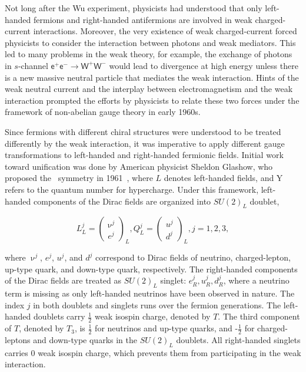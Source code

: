 Not long after the Wu experiment, physicists had understood that only left-handed fermions and right-handed antifermions are involved in weak charged-current interactions. Moreover, the very existence of weak charged-current forced physicists to consider the interaction between photons and weak mediators. This led to many problems in the weak theory, for example, the exchange of photons in $s$-channel $\textsf{e}^{+}\textsf{e}^{-}\rightarrow\textsf{W}^{+}\textsf{W}^{-}$ would lead to divergence at high energy unless there is a new massive neutral particle that mediates the weak interaction. Hints of the weak neutral current and the interplay between electromagnetism and the weak interaction prompted the efforts by physicists to relate these two forces under the framework of non-abelian gauge theory in early 1960s. 

Since fermions with different chiral structures were understood to be treated differently by the weak interaction, it was 
imperative to apply different gauge transformations to left-handed and right-handed fermionic fields. Initial work toward unification was done by American physicist Sheldon Glashow, who proposed the \ew~symmetry in 1961~\cite{Glashow:1961tr}, where $L$ denotes left-handed fields, and Y refers to the quantum number for hypercharge. Under this framework, left-handed components of the Dirac fields are organized into $SU(2)_{L}$ doublet,

\begin{equation}
L_{L}^{j}=\begin{pmatrix}\upnu^{j}\\ e^{j}\end{pmatrix}_{L}, Q_{L}^{j}=\begin{pmatrix}u^j\\d^j\end{pmatrix}_{L}, j=1, 2, 3,
\end{equation}

where $\upnu^{j}$, $e^{j}$, $u^{j}$, and $d^{j}$ correspond to Dirac fields of neutrino, charged-lepton, up-type quark, and down-type quark, respectively. The right-handed components of the Dirac fields are treated as $SU(2)_{L}$ singlet: $e_{R}^{j}, u_{R}^{j}, d_{R}^{j}$, where a neutrino term is missing as only left-handed neutrinos have been observed in nature. The index $j$ in both doublets and singlets runs over the fermion generations. The left-handed doublets carry $\frac{1}{2}$ weak isospin charge, denoted by $T$. The third component of $T$, denoted by $T_3$, is $\frac{1}{2}$ for neutrinos and up-type quarks, and -$\frac{1}{2}$ for charged-leptons and down-type quarks in the $SU(2)_{L}$ doublets. All right-handed singlets carries 0 weak isospin charge, which prevents them from participating in the weak interaction. 


